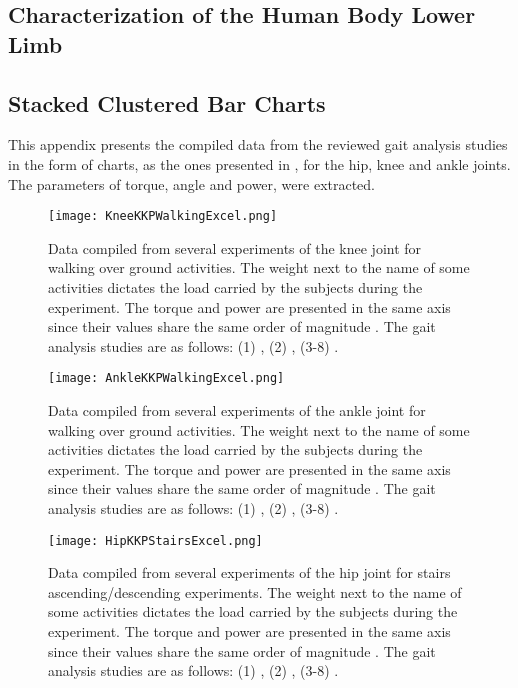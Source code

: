 \begin{appendix} 
\chapter{Characterization of the Human Body Lower Limb} \label{appendixA}
\section{Stacked Clustered Bar Charts}
This appendix presents the compiled data from the reviewed gait analysis studies in the form of charts, as the ones presented in , for the hip, knee and ankle joints. The parameters of torque, angle and power, were extracted.

\begin{figure}[htbp]
\centering
    \texttt{[image: KneeKKPWalkingExcel.png]}
    \caption{Data compiled from several experiments of the knee joint for walking over ground activities. The weight next to the name of some activities dictates the load carried by the subjects during the experiment. The torque and power are presented in the same axis since their values share the  same order of magnitude \cite{solis2017characterization}. The gait analysis studies are as follows: (1) \cite{bovi2011multiple}, (2) \cite{lee2008biomechanics}, (3-8) \cite{han2011biomechanical}.}
    \label{fig:kneeKKPWalking}
\end{figure}

\begin{figure}[htbp]
\centering
    \texttt{[image: AnkleKKPWalkingExcel.png]}
    \caption{Data compiled from several experiments of the ankle joint for walking over ground activities. The weight next to the name of some activities dictates the load carried by the subjects during the experiment. The torque and power are presented in the same axis since their values share the  same order of magnitude \cite{solis2017characterization}. The gait analysis studies are as follows: (1) \cite{bovi2011multiple}, (2) \cite{lee2008biomechanics}, (3-8) \cite{han2011biomechanical}.}
    \label{fig:ankleKKPWalking}
\end{figure}

\begin{figure}[htbp]
    \centering
    \texttt{[image: HipKKPStairsExcel.png]}
    \caption{Data compiled from several experiments of the hip joint for stairs ascending/descending experiments. The weight next to the name of some activities dictates the load carried by the subjects during the experiment. The torque and power are presented in the same axis since their values share the  same order of magnitude \cite{solis2017characterization}. The gait analysis studies are as follows: (1) \cite{bovi2011multiple}, (2) \cite{lee2008biomechanics}, (3-8) \cite{han2011biomechanical}. }
    \label{fig:hipKKPStairs}
\end{figure}


\end{appendix}
